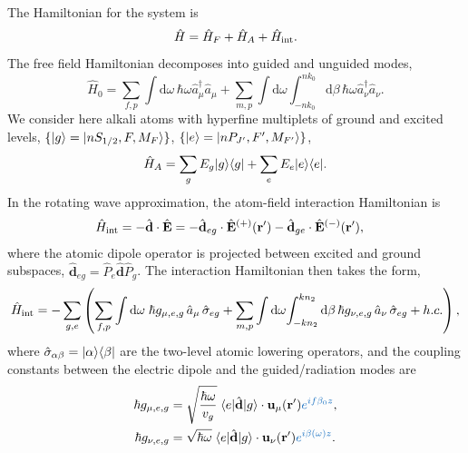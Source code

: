 \documentclass[preprint,aps,pra,onecolumn]{revtex4-1} %
\newcommand{\inter}{{\rm int}}
\newcommand{\change}[1]{{\color{RoyalBlue} #1}}
\begin{document}
The Hamiltonian for the system is
\begin{equation}
\hat{H} = \hat{H}_F+\hat{H}_A + \hat{H}_{\inter}.
\end{equation}
The free field Hamiltonian decomposes into guided and unguided modes, 
\begin{equation}
\hat{H}_0 = \sum_{f,p}\int \mathrm{d}\omega \, \hbar \omega \hat{a}^\dagger_\mu \hat{a}_\mu 
+\sum_{m,p} \int \mathrm{d}\omega  \int_{-nk_0}^{nk_0} \mathrm{d}\beta \, \hbar \omega 
\hat{a}^\dagger_\nu \hat{a}_\nu.
\end{equation}
We consider here alkali atoms with hyperfine multiplets of ground and excited levels, $\{ 
\lvert{g}\rangle=\lvert{nS_{1/2}, F, M_F}\rangle\}$, $\{ \lvert{e}\rangle =\lvert{nP_{J'}, F', M_{F'}}\rangle\}$,
\begin{equation}
\hat{H}_A  = \sum_g E_g \lvert{g}\rangle\langle{g}\rvert + \sum_e E_e \lvert{e}\rangle\langle{e}\rvert.
\end{equation}
In the rotating wave approximation, the atom-field interaction Hamiltonian is
\begin{align}
\hat{H}_{\inter} &= -\hat{\mathbf{d}}\cdot \hat{\mathbf{E}} = -\hat{\mathbf{d}}_{eg}\cdot 
\hat{\mathbf{E}}^{(+)}(\br')-\hat{\mathbf{d}}_{ge}\cdot \hat{\mathbf{E}}^{(-)}(\br'),
\end{align}
where the atomic dipole operator is projected between excited and ground subspaces, $\hat{\mathbf{d}}_{eg}= \hat{P}_e \hat{\mathbf{d}} \hat{P}_g $. The interaction Hamiltonian then takes the form, 
\begin{equation}
\hat{H}_{\inter} = -\sum_{g,e} \left(\sum_{f,p} \int\mathrm{d}\omega \; \hbar g_{\mu, e,g}\, \hat{a}_\mu  \, 
\hat{\sigma}_{eg}+ \sum_{m,p} \int\mathrm{d}\omega \! \int_{-kn_2}^{kn_2}\mathrm{d}\beta \,  \hbar 
g_{\nu, e,g}\, \hat{a}_\nu \, \hat{\sigma}_{eg}+  h.c.\right),
\end{equation}
where $\hat{\sigma}_{\alpha\beta}= \lvert{\alpha}\rangle\langle{\beta}\rvert$ are the two-level atomic lowering operators, and 
the coupling constants between the electric dipole and the guided/radiation modes are
\begin{subequations} \label{Eq::CouplingConstants}
\begin{align}
\hbar g_{\mu, e,g} &= \sqrt{\frac{\hbar \omega}{v_g}}\; \bra{e} \hat{\mathbf{d}} \ket{g} 
\cdot\mathbf{u}_\mu (\br') \change{  e^{i f \beta_0z} }, \\
\hbar g_{\nu, e,g} &= \sqrt{\hbar \omega} \; \bra{e} \hat{\mathbf{d}} \ket{g} \cdot \mathbf{u}_\nu (\br')  \change{  e^{i\beta(\omega)z} } .
\end{align}
\end{subequations}
\end{document}
